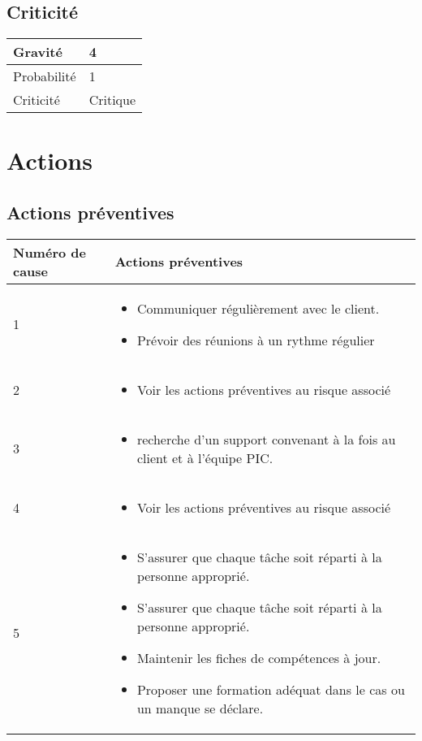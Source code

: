 \subsection*{Criticité}

\begin{table}[H]
\centering
	\begin{tabularx}{16.8cm}{|>{\columncolor{gray!40}}X|X|}
	\hline
	Gravité & 4\\
	\hline
	Probabilité & 1\\
	\hline
	Criticité & Critique\\
	\hline
	\end{tabularx}
\end{table}
\newpage

\section*{Actions}
\subsection*{Actions préventives}

\centering
	\begin{longtable}{|p{7cm}|p{7cm}|}
	\hline
	\rowcolor{gray!40} Numéro de cause & Actions préventives \\
	\hline
	 1 & \begin{itemize}
	 	\item Communiquer régulièrement avec le client.
	 	\item
	 	Prévoir des réunions à un rythme régulier
	 \end{itemize} \\
	\hline
	2 & \begin{itemize}
		\item Voir les actions préventives au risque associé 
	\end{itemize} \\
	\hline
	3 & \begin{itemize}
		\item recherche d'un support convenant à la fois au client et à l'équipe PIC.
	\end{itemize} \\
	\hline
	4 & \begin{itemize}
		\item Voir les actions préventives au risque associé 
	\end{itemize} \\
	\hline
	5 & \begin{itemize}
		\item S'assurer que chaque tâche soit réparti
à la personne approprié.
	\item
	S'assurer que chaque tâche soit réparti
à la personne approprié.
\item Maintenir les fiches de compétences à jour. 
\item Proposer une formation adéquat dans le cas ou un manque se déclare.	
	
	\end{itemize} \\
	\hline
	\end{longtable}

